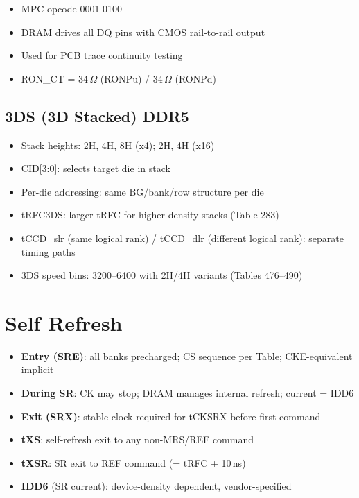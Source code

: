 \documentclass[10pt,a4paper,twoside]{article}
\begin{document}
\begin{itemize}
  \item MPC opcode 0001 0100
  \item DRAM drives all DQ pins with CMOS rail-to-rail output
  \item Used for PCB trace continuity testing
  \item RON\_CT = 34\,$\Omega$ (RONPu) / 34\,$\Omega$ (RONPd)
\end{itemize}

\subsection{3DS (3D Stacked) DDR5}

\begin{itemize}
  \item Stack heights: 2H, 4H, 8H (x4); 2H, 4H (x16)
  \item CID[3:0]: selects target die in stack
  \item Per-die addressing: same BG/bank/row structure per die
  \item tRFC3DS: larger tRFC for higher-density stacks (Table 283)
  \item tCCD\_slr (same logical rank) / tCCD\_dlr (different logical rank): separate timing paths
  \item 3DS speed bins: 3200--6400 with 2H/4H variants (Tables 476--490)
\end{itemize}

\section{Self Refresh}

\begin{itemize}
  \item \textbf{Entry (SRE)}: all banks precharged; CS sequence per Table; CKE-equivalent implicit
  \item \textbf{During SR}: CK may stop; DRAM manages internal refresh; current = IDD6
  \item \textbf{Exit (SRX)}: stable clock required for tCKSRX before first command
  \item \textbf{tXS}: self-refresh exit to any non-MRS/REF command
  \item \textbf{tXSR}: SR exit to REF command (= tRFC + 10\,ns)
  \item \textbf{IDD6} (SR current): device-density dependent, vendor-specified
\end{itemize}
\end{document}

